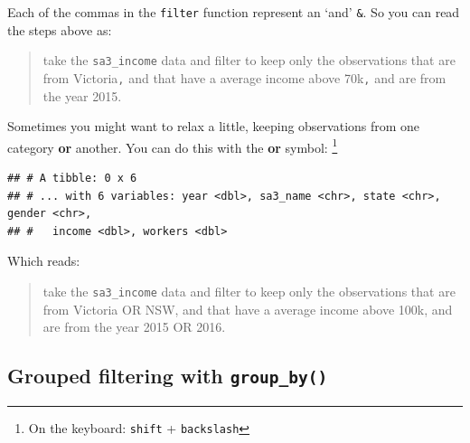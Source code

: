 \documentclass[]{book}
\newenvironment{Shaded}{\begin{snugshade}}{\end{snugshade}}
\newcommand{\DecValTok}[1]{\textcolor[rgb]{0.00,0.00,0.81}{#1}}
\newcommand{\KeywordTok}[1]{\textcolor[rgb]{0.13,0.29,0.53}{\textbf{#1}}}
\newcommand{\NormalTok}[1]{#1}
\newcommand{\OperatorTok}[1]{\textcolor[rgb]{0.81,0.36,0.00}{\textbf{#1}}}
\newcommand{\StringTok}[1]{\textcolor[rgb]{0.31,0.60,0.02}{#1}}
\begin{document}
Each of the commas in the \texttt{filter} function represent an `and' \texttt{\&}. So you can read the steps above as:

\begin{quote}
take the \texttt{sa3\_income} data and filter to keep only the observations that are from Victoria\texttt{,} and that have a average income above 70k\texttt{,} and are from the year 2015.
\end{quote}

Sometimes you might want to relax a little, keeping observations from one category \textbf{or} another. You can do this with the \textbf{or} symbol: \texttt{\textbar{}}\footnote{On the keyboard: \texttt{shift} + \texttt{backslash}}

\begin{Shaded}
\end{Shaded}

\begin{verbatim}
## # A tibble: 0 x 6
## # ... with 6 variables: year <dbl>, sa3_name <chr>, state <chr>, gender <chr>,
## #   income <dbl>, workers <dbl>
\end{verbatim}

Which reads:

\begin{quote}
take the \texttt{sa3\_income} data and filter to keep only the observations that are from Victoria OR NSW, and that have a average income above 100k, and are from the year 2015 OR 2016.
\end{quote}

\hypertarget{grouped-filtering-with-group_by}{%
\subsection{\texorpdfstring{Grouped filtering with \texttt{group\_by()}}{Grouped filtering with group\_by()}}\label{grouped-filtering-with-group_by}}
\end{document}
